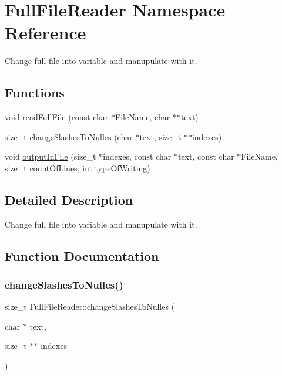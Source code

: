 \hypertarget{namespaceFullFileReader}{}\section{Full\+File\+Reader Namespace Reference}
\label{namespaceFullFileReader}


Change full file into variable and manupulate with it.  


\subsection*{Functions}
\begin{DoxyCompactItemize}
\item 
void \hyperlink{namespaceFullFileReader_a8a8460ef01d33cf06aa7418ff53d329c}{read\+Full\+File} (const char $\ast$File\+Name, char $\ast$$\ast$text)
\item 
size\+\_\+t \hyperlink{namespaceFullFileReader_afefb39a3a7630f4961134c7fcf9ee629}{change\+Slashes\+To\+Nulles} (char $\ast$text, size\+\_\+t $\ast$$\ast$indexes)
\item 
void \hyperlink{namespaceFullFileReader_ad68368b822d1c1085e8facc9124fd646}{output\+In\+File} (size\+\_\+t $\ast$indexes, const char $\ast$text, const char $\ast$File\+Name, size\+\_\+t count\+Of\+Lines, int type\+Of\+Writing)
\end{DoxyCompactItemize}


\subsection{Detailed Description}
Change full file into variable and manupulate with it. 

\subsection{Function Documentation}
\mbox{\label{namespaceFullFileReader_afefb39a3a7630f4961134c7fcf9ee629}} 
\subsubsection{\texorpdfstring{change\+Slashes\+To\+Nulles()}{changeSlashesToNulles()}}
{\footnotesize\ttfamily size\+\_\+t Full\+File\+Reader\+::change\+Slashes\+To\+Nulles (\begin{DoxyParamCaption}\item[{char $\ast$}]{text,  }\item[{size\+\_\+t $\ast$$\ast$}]{indexes }\end{DoxyParamCaption})}

